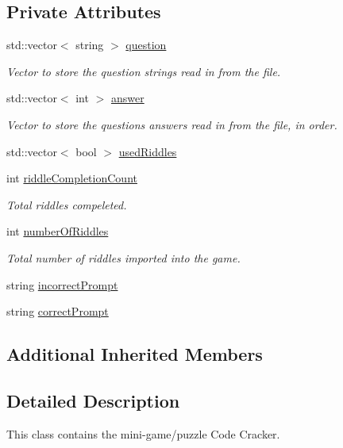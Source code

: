 \subsection*{Private Attributes}
\begin{DoxyCompactItemize}
\item 
std\-::vector$<$ string $>$ \hyperlink{classCodeCracker_a63753bcf7954495c7964715758e0fea9}{question}
\begin{DoxyCompactList}\small\item\em Vector to store the question strings read in from the file. \end{DoxyCompactList}\item 
std\-::vector$<$ int $>$ \hyperlink{classCodeCracker_a536d437eb93888574fb5f8f0c556c528}{answer}
\begin{DoxyCompactList}\small\item\em Vector to store the questions answers read in from the file, in order. \end{DoxyCompactList}\item 
std\-::vector$<$ bool $>$ \hyperlink{classCodeCracker_ab5121bae8b22dc3fcf3f8995c1a9a425}{used\-Riddles}
\item 
int \hyperlink{classCodeCracker_aca60d7cc01bda0ec6782984e46b9b357}{riddle\-Completion\-Count}
\begin{DoxyCompactList}\small\item\em Total riddles compeleted. \end{DoxyCompactList}\item 
int \hyperlink{classCodeCracker_a30671a1b282dc98361938283fbafcf6e}{number\-Of\-Riddles}
\begin{DoxyCompactList}\small\item\em Total number of riddles imported into the game. \end{DoxyCompactList}\item 
string \hyperlink{classCodeCracker_a89ef12be75881a80ed411daf64bb425c}{incorrect\-Prompt}
\item 
string \hyperlink{classCodeCracker_a04985dac2f5fe286fa82679217cfe506}{correct\-Prompt}
\end{DoxyCompactItemize}
\subsection*{Additional Inherited Members}


\subsection{Detailed Description}
This class contains the mini-\/game/puzzle Code Cracker. 

